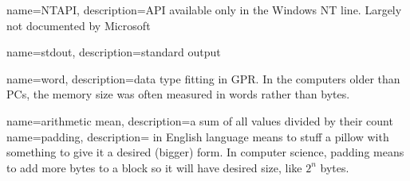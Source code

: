 {
  name=NTAPI,
  description={\ac{API} available only in the Windows NT line.  Largely not documented by Microsoft}
}

{
  name=stdout,
  description={standard output}
}

{
  name=word,
  description={data type fitting in \ac{GPR}.
  In the computers older than PCs, 
  the memory size was often measured in words rather than bytes.}
}

{
  name=arithmetic mean,
  description={a sum of all values divided by their count}
}
{
  name=padding,
  description={
   in English language means to stuff a pillow with something
  to give it a desired (bigger) form.
  In computer science, padding means to add more bytes to a block so it will have desired size, like $2^n$ bytes.}
}


